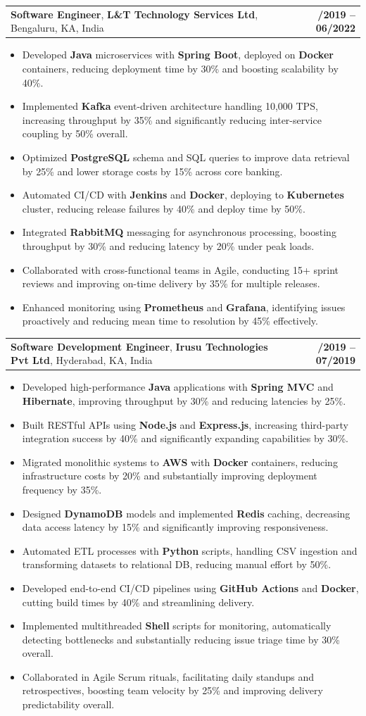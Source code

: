 \documentclass[letterpaper,11pt]{article}
\makeatletter
\newcommand{\resumeItem}[1]{
  \item\footnotesize{
    {#1 \vspace{-2pt}}
  }
}
\newcommand{\resumeSubheading}[4]{
  \vspace{-2pt}\item
    \begin{tabular*}{1.0\textwidth}[t]{l@{\extracolsep{\fill}}r}
      \textbf{\fontsize{10pt}{14pt}\selectfont #3}, \textbf{\fontsize{10pt}{14pt}\selectfont #1}, \fontsize{10pt}{14pt}\selectfont #4 & \textbf{\fontsize{10pt}{14pt}\selectfont #2} \\
    \end{tabular*}\vspace{-7pt}
}
\newcommand{\resumeItemListStart}{\begin{itemize}[leftmargin=*]}
\newcommand{\resumeItemListEnd}{\end{itemize}\vspace{-5pt}}
\makeatother
\begin{document}
    \resumeSubheading
        {L\&T Technology Services Ltd}{08/2019 -- 06/2022}
        {Software Engineer}{Bengaluru, KA, India}
      \resumeItemListStart
        \resumeItem{Developed \textbf{Java} microservices with \textbf{Spring Boot}, deployed on \textbf{Docker} containers, reducing deployment time by 30\% and boosting scalability by 40\%.}
        \resumeItem{Implemented \textbf{Kafka} event-driven architecture handling 10,000 TPS, increasing throughput by 35\% and significantly reducing inter-service coupling by 50\% overall.}
        \resumeItem{Optimized \textbf{PostgreSQL} schema and SQL queries to improve data retrieval by 25\% and lower storage costs by 15\% across core banking.}
        \resumeItem{Automated CI/CD with \textbf{Jenkins} and \textbf{Docker}, deploying to \textbf{Kubernetes} cluster, reducing release failures by 40\% and deploy time by 50\%.}
        \resumeItem{Integrated \textbf{RabbitMQ} messaging for asynchronous processing, boosting throughput by 30\% and reducing latency by 20\% under peak loads.}
        \resumeItem{Collaborated with cross-functional teams in Agile, conducting 15+ sprint reviews and improving on-time delivery by 35\% for multiple releases.}
        \resumeItem{Enhanced monitoring using \textbf{Prometheus} and \textbf{Grafana}, identifying issues proactively and reducing mean time to resolution by 45\% effectively.}
      \resumeItemListEnd

    \resumeSubheading
        {Irusu Technologies Pvt Ltd}{01/2019 -- 07/2019}
        {Software Development Engineer}{Hyderabad, KA, India}
      \resumeItemListStart
        \resumeItem{Developed high-performance \textbf{Java} applications with \textbf{Spring MVC} and \textbf{Hibernate}, improving throughput by 30\% and reducing latencies by 25\%.}
        \resumeItem{Built RESTful APIs using \textbf{Node.js} and \textbf{Express.js}, increasing third-party integration success by 40\% and significantly expanding capabilities by 30\%.}
        \resumeItem{Migrated monolithic systems to \textbf{AWS} with \textbf{Docker} containers, reducing infrastructure costs by 20\% and substantially improving deployment frequency by 35\%.}
        \resumeItem{Designed \textbf{DynamoDB} models and implemented \textbf{Redis} caching, decreasing data access latency by 15\% and significantly improving responsiveness.}
        \resumeItem{Automated ETL processes with \textbf{Python} scripts, handling CSV ingestion and transforming datasets to relational DB, reducing manual effort by 50\%.}
        \resumeItem{Developed end-to-end CI/CD pipelines using \textbf{GitHub Actions} and \textbf{Docker}, cutting build times by 40\% and streamlining delivery.}
        \resumeItem{Implemented multithreaded \textbf{Shell} scripts for monitoring, automatically detecting bottlenecks and substantially reducing issue triage time by 30\% overall.}
        \resumeItem{Collaborated in Agile Scrum rituals, facilitating daily standups and retrospectives, boosting team velocity by 25\% and improving delivery predictability overall.}
      \resumeItemListEnd
\end{document}
